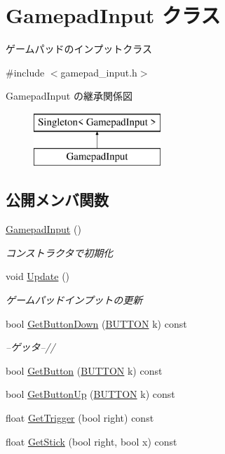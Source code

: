 \hypertarget{class_gamepad_input}{}\section{Gamepad\+Input クラス}
\label{class_gamepad_input}


ゲームパッドのインプットクラス  




{\ttfamily \#include $<$gamepad\+\_\+input.\+h$>$}

Gamepad\+Input の継承関係図\begin{figure}[H]
\begin{center}
\leavevmode
\includegraphics[height=2.000000cm]{class_gamepad_input}
\end{center}
\end{figure}
\subsection*{公開メンバ関数}
\begin{DoxyCompactItemize}
\item 
\mbox{\hyperlink{class_gamepad_input_acd9878326e438f379020827d63ebd6cf}{Gamepad\+Input}} ()
\begin{DoxyCompactList}\small\item\em コンストラクタで初期化 \end{DoxyCompactList}\item 
void \mbox{\hyperlink{class_gamepad_input_a3512c0cc4d57534c83db09c4b5377caa}{Update}} ()
\begin{DoxyCompactList}\small\item\em ゲームパッドインプットの更新 \end{DoxyCompactList}\item 
bool \mbox{\hyperlink{class_gamepad_input_a7e7a0e3d48ce3f91332fd52c4c92bb8f}{Get\+Button\+Down}} (\mbox{\hyperlink{gamepad__input_8h_a739845b0076428add52ca3cec492e705}{B\+U\+T\+T\+ON}} k) const
\begin{DoxyCompactList}\small\item\em --ゲッタ--// \end{DoxyCompactList}\item 
bool \mbox{\hyperlink{class_gamepad_input_a2bf3c765fd5e4261a0ab56c8871bd614}{Get\+Button}} (\mbox{\hyperlink{gamepad__input_8h_a739845b0076428add52ca3cec492e705}{B\+U\+T\+T\+ON}} k) const
\item 
bool \mbox{\hyperlink{class_gamepad_input_a2c013028c4e0983a957666ff9922a40c}{Get\+Button\+Up}} (\mbox{\hyperlink{gamepad__input_8h_a739845b0076428add52ca3cec492e705}{B\+U\+T\+T\+ON}} k) const
\item 
float \mbox{\hyperlink{class_gamepad_input_ac3910a477532b943f2235571dda111ae}{Get\+Trigger}} (bool right) const
\item 
float \mbox{\hyperlink{class_gamepad_input_ab4d17ae95ad91e106a6a95a4a2976abf}{Get\+Stick}} (bool right, bool x) const
\end{DoxyCompactItemize}
